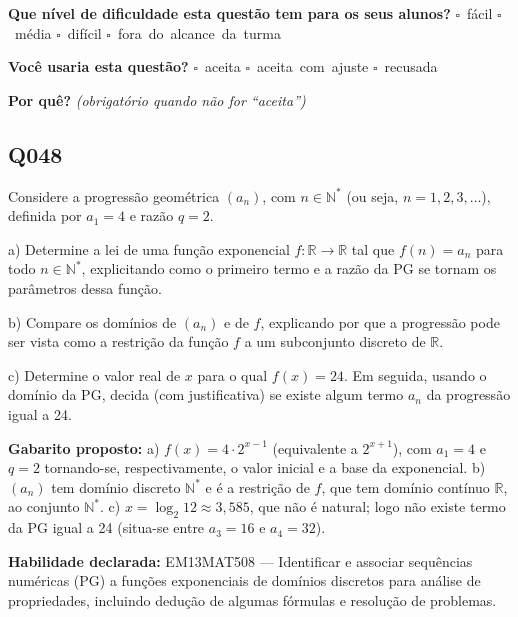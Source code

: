 \documentclass[11pt,a4paper]{article}
\begin{document}
\textbf{Que nível de dificuldade esta questão tem para os seus alunos?}\quad
\mbox{$\square$~fácil} \quad \mbox{$\square$~média} \quad
\mbox{$\square$~difícil} \quad \mbox{$\square$~fora do alcance da turma}

\textbf{Você usaria esta questão?}\quad
\mbox{$\square$~aceita} \quad \mbox{$\square$~aceita com ajuste} \quad
\mbox{$\square$~recusada}

\textbf{Por quê?} \emph{(obrigatório quando não for ``aceita'')}

\underline{\hspace{\linewidth}}

\underline{\hspace{\linewidth}}
\vspace{0.6em}

\begin{samepage}
\subsection*{Q048}
Considere a progressão geométrica $(a_n)$, com $n \in \mathbb{N}^{*}$ (ou seja, $n = 1, 2, 3, \dots$), definida por $a_1 = 4$ e razão $q = 2$.

a) Determine a lei de uma função exponencial $f:\mathbb{R}\to\mathbb{R}$ tal que $f(n) = a_n$ para todo $n \in \mathbb{N}^{*}$, explicitando como o primeiro termo e a razão da PG se tornam os parâmetros dessa função.

b) Compare os domínios de $(a_n)$ e de $f$, explicando por que a progressão pode ser vista como a restrição da função $f$ a um subconjunto discreto de $\mathbb{R}$.

c) Determine o valor real de $x$ para o qual $f(x) = 24$. Em seguida, usando o domínio da PG, decida (com justificativa) se existe algum termo $a_n$ da progressão igual a 24.

\textbf{Gabarito proposto:} a) $f(x) = 4\cdot 2^{x-1}$ (equivalente a $2^{x+1}$), com $a_1=4$ e $q=2$ tornando-se, respectivamente, o valor inicial e a base da exponencial. b) $(a_n)$ tem domínio discreto $\mathbb{N}^{*}$ e é a restrição de $f$, que tem domínio contínuo $\mathbb{R}$, ao conjunto $\mathbb{N}^{*}$. c) $x=\log_2 12\approx 3{,}585$, que não é natural; logo não existe termo da PG igual a 24 (situa-se entre $a_3=16$ e $a_4=32$).

\textbf{Habilidade declarada:} EM13MAT508 --- Identificar e associar sequências numéricas (PG) a funções exponenciais de domínios discretos para análise de propriedades, incluindo dedução de algumas fórmulas e resolução de problemas.
\end{samepage}
\end{document}
